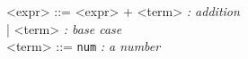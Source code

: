 \documentclass{article}
\begin{document}
\begin{bnf*}
<expr> ::= <expr> + <term> \quad \textit{: addition} \\
        | <term> \quad \textit{: base case} \\
<term> ::= \texttt{num} \quad \textit{: a number}
\end{bnf*}
\end{document}

